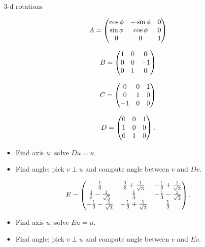 \documentclass{beamer}
\begin{document}
\begin{frame}
\begin{center}
{\huge 3-d rotations}
\end{center}


\end{frame}
\begin{frame}
\begin{Example}
\[A=\begin{pmatrix} \cos\phi & -\sin\phi & 0 \\ \sin\phi & \cos\phi & 0 \\ 0 &
0 & 1\end{pmatrix}\]


\[B=\begin{pmatrix} 1 & 0 & 0 \\ 0 & 0 & -1 \\ 0 & 1 & 0 \end{pmatrix}\]


\[C=\begin{pmatrix} 0 & 0 & 1 \\ 0 & 1 & 0 \\ -1 & 0 & 0\end{pmatrix}\]


\end{Example}
\end{frame}
\begin{frame}
\begin{Example}
\[D=\begin{pmatrix} 0 & 0 & 1 \\ 1 & 0 & 0 \\ 0 & 1 & 0\end{pmatrix}.\]


\end{Example}
\begin{itemize}
\item Find axis \(u\): solve \(Du=u\).
\item Find angle: pick \(v\perp u\) and compute angle between \(v\) and
\(Dv\).


\end{itemize}
\end{frame}
\begin{frame}
\begin{Example}
\[E=\begin{pmatrix} \frac{1}{3} & \frac{1}{3}+\frac{1}{\sqrt{3}} &
-\frac{1}{3}+\frac{1}{\sqrt{3}} \\ \frac{1}{3}-\frac{1}{\sqrt{3}}
& \frac{1}{3} &
-\frac{1}{3}-\frac{1}{\sqrt{3}}\\ -\frac{1}{3}-\frac{1}{\sqrt{3}}
& -\frac{1}{3}+\frac{1}{\sqrt{3}} & \frac{1}{3} \end{pmatrix}.\]


\end{Example}
\begin{itemize}
\item Find axis \(u\): solve \(Eu=u\).
\item Find angle: pick \(v\perp u\) and compute angle between \(v\) and
\(Ev\).


\end{itemize}
\end{frame}
\end{document}
